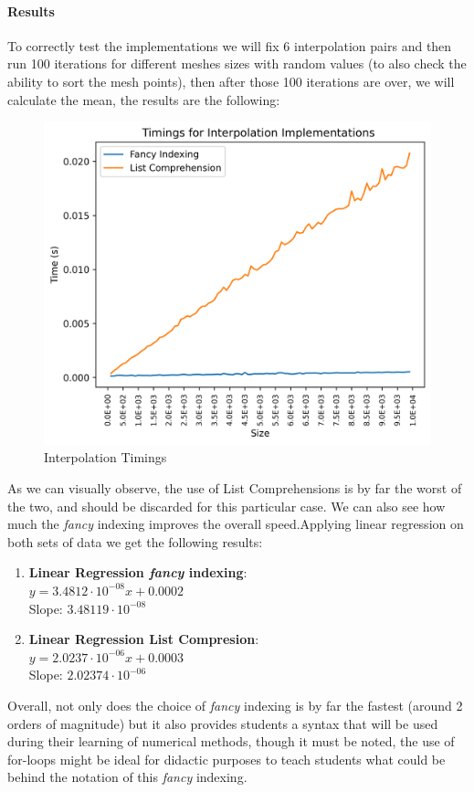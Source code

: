 \paragraph{Results}
To correctly test the implementations we will fix 6 interpolation pairs and then run 100 iterations for different meshes sizes with random values (to also check the ability to sort the mesh points), then after those 100 iterations are over, we will calculate the mean, the results are the following:
\begin{figure}[H]
    \centering
    \includegraphics[scale=0.9]{Include/Images/Thesis/Analysis of Solutions/Interpolation/Interpolation Timings.png}
    \caption{Interpolation Timings}
    \label{fig:Interpolation Timings}
\end{figure}

As we can visually observe, the use of List Comprehensions is by far the worst of the two, and should be discarded for this particular case. We can also see how much the \textit{fancy} indexing improves the overall speed.Applying linear regression on both sets of data we get the following results:
\begin{enumerate}
    \item \textbf{Linear Regression \textit{fancy} indexing}: \\
        $y = 3.4812\cdot10^{-08}x + 0.0002$ \\
        Slope: $3.48119\cdot10^{-08}$
    \item \textbf{Linear Regression List Compresion}: \\
        $y = 2.0237\cdot10^{-06}x + 0.0003$ \\
        Slope: $2.02374\cdot10^{-06}$
\end{enumerate}

Overall, not only does the choice of \textit{fancy} indexing is by far the fastest (around 2 orders of magnitude) but it also provides students a syntax that will be used during their learning of numerical methods, though it must be noted, the use of for-loops might be ideal for didactic purposes to teach students what could be behind the notation of this \textit{fancy} indexing.




